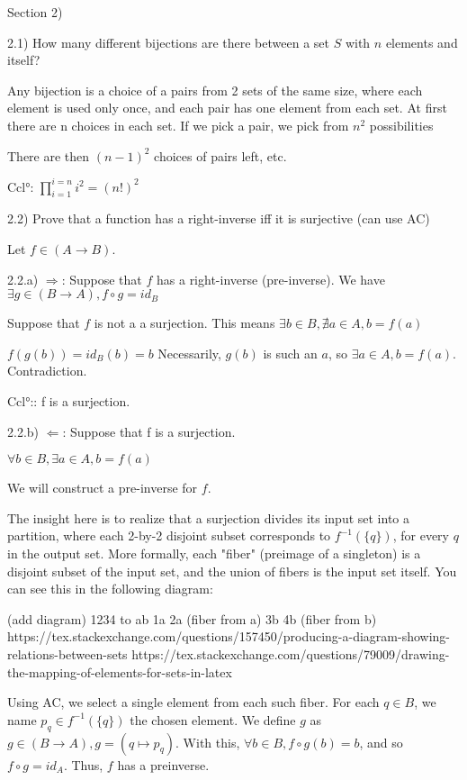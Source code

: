 Section 2)

2.1) How many different bijections are there between a set $S$ with $n$ elements and itself?

Any bijection is a choice of a pairs from 2 sets of the same size, where each element is used only once, and each pair has one element from each set. At first there are n choices in each set. If we pick a pair, we pick from $n^2$ possibilities 

There are then $(n-1)^2$ choices of pairs left, etc.

Ccl°: $\prod_{i=1}^{i=n} i^2 = (n!)^2$



2.2) Prove that a function has a right-inverse iff it is surjective (can use AC)

Let $f \in (A \to B)$.

2.2.a) $\Rightarrow$: Suppose that $f$ has a right-inverse (pre-inverse).
We have $\exists g \in (B \to A), f \circ g = id_B$

Suppose that $f$ is not a a surjection. This means $\exists b \in B, \nexists a \in A, b = f(a)$

$f(g(b))= id_B (b) = b$ Necessarily, $g(b)$ is such an $a$, so $\exists a \in A, b = f(a)$. Contradiction.

Ccl°:: f is a surjection.

2.2.b) $\Leftarrow$: Suppose that f is a surjection.

$\forall b \in B, \exists a \in A, b = f(a)$

We will construct a pre-inverse for $f$.

The insight here is to realize that a surjection divides its input set into a partition, where each 2-by-2 disjoint subset corresponds to $f^{-1}(\{q\})$, for every $q$ in the output set. More formally, each "fiber" (preimage of a singleton) is a disjoint subset of the input set, and the union of fibers is the input set itself. You can see this in the following diagram:

(add diagram)
1234 to ab
1a 2a (fiber from a)
3b 4b (fiber from b)
https://tex.stackexchange.com/questions/157450/producing-a-diagram-showing-relations-between-sets
https://tex.stackexchange.com/questions/79009/drawing-the-mapping-of-elements-for-sets-in-latex

Using AC, we select a single element from each such fiber. For each $q \in B$, we name $p_q \in f^{-1}(\{q\})$ the chosen element. We define $g$ as $g \in (B \to A), g = (q \mapsto p_q)$. With this, $\forall b \in B, f \circ g (b) = b$, and so $f \circ g = id_A$. Thus, $f$ has a preinverse.

